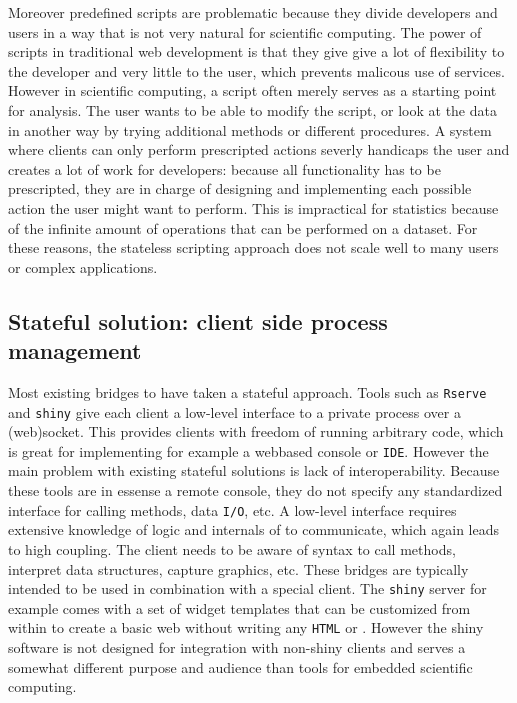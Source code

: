 Moreover predefined scripts are problematic because they divide developers and users in a way that is not very natural for scientific computing. The power of scripts in traditional web development is that they give give a lot of flexibility to the developer and very little to the user, which prevents malicous use of services. However in scientific computing, a script often  merely serves as a starting point for analysis. The user wants to be able to modify the script, or look at the data in another way by trying additional methods or different procedures. A system where clients can only perform prescripted actions severly handicaps the user and creates a lot of work for developers: because all functionality has to be prescripted, they are in charge of designing and implementing each possible action the user might want to perform. This is impractical for statistics because of the infinite amount of operations that can be performed on a dataset. For these reasons, the stateless scripting approach does not scale well to many users or complex applications.

\subsection{Stateful solution: client side process management}

Most existing bridges to \R have taken a stateful approach. Tools such as \texttt{Rserve} \citep{urbanek2013rserve} and \texttt{shiny} \citep{shiny} give each client a low-level interface to a private \R process over a (web)socket. This provides clients with freedom of running arbitrary \R code, which is great for implementing for example a webbased console or \texttt{IDE}. However the main problem with existing stateful solutions is lack of interoperability. Because these tools are in essense a remote \R console, they do not specify any standardized interface for calling methods, data \texttt{I/O}, etc. A low-level interface requires extensive knowledge of logic and internals of \R to communicate, which again leads to high coupling. The client needs to be aware of \R syntax to call \R methods, interpret \R data structures, capture graphics, etc. These bridges are typically intended to be used in combination with a special client. The \texttt{shiny} server for example comes with a set of widget templates that can be customized from within \R to create a basic web \GUI without writing any \texttt{HTML} or \JavaScript. However the shiny software is not designed for integration with non-shiny clients and serves a somewhat different purpose and audience than tools for embedded scientific computing.

